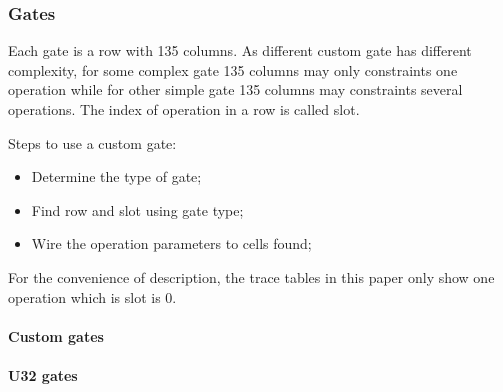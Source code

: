 \subsubsection{Gates} \label{sec:gates}

Each gate is a row with 135 columns. As different custom gate has different complexity, for some complex gate 135 columns may only constraints one
operation while for other simple gate 135 columns may constraints several operations. The index of operation in a row is called slot.

Steps to use a custom gate:
\begin{itemize}
    \item Determine the type of gate;
    \item Find row and slot using gate type;
    \item Wire the operation parameters to cells found;
\end{itemize}

For the convenience of description, the trace tables in this paper only show one operation which is slot is 0.

\paragraph{Custom gates}










\paragraph{U32 gates}




